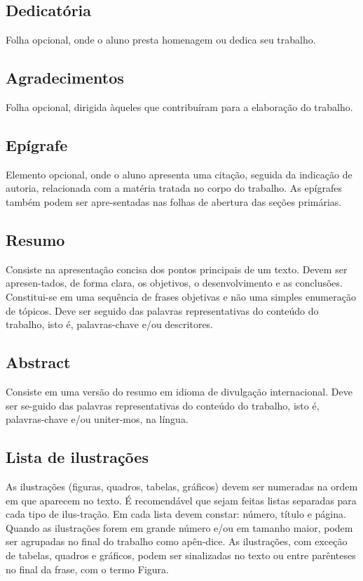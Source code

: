\subsection{Dedicatória}

Folha opcional, onde o aluno presta homenagem ou dedica seu trabalho.

\subsection{Agradecimentos}

Folha opcional, dirigida àqueles que contribuíram para a
elaboração do trabalho.

\subsection{Epígrafe}

Elemento opcional, onde o aluno apresenta uma citação, seguida da
indicação de autoria, relacionada com a matéria tratada no corpo do trabalho. As epígrafes também podem ser apre-sentadas nas folhas de abertura das seções primárias.

\subsection{Resumo}

Consiste na apresentação concisa dos pontos principais de um
texto. Devem ser apresen-tados, de forma clara, os objetivos, o desenvolvimento e as conclusões. Constitui-se em uma sequência de frases objetivas e não uma simples enumeração de tópicos. Deve ser seguido das palavras representativas do conteúdo do trabalho, isto é, palavras-chave e/ou descritores.

\subsection{Abstract}

Consiste em uma versão do resumo em idioma de divulgação
internacional. Deve ser se-guido das palavras representativas do conteúdo do trabalho, isto é, palavras-chave e/ou uniter-mos, na língua.

\subsection{Lista de ilustrações}

As ilustrações (figuras, quadros, tabelas, gráficos) devem ser
numeradas na ordem em que aparecem no texto. É recomendável que sejam feitas listas separadas para cada tipo de ilus-tração. Em cada lista devem constar: número, título e página. Quando as ilustrações forem em grande número e/ou em tamanho maior, podem ser agrupadas no final do trabalho como apên-dice. As ilustrações, com exceção de tabelas, quadros e gráficos, podem ser sinalizadas no texto ou entre parênteses no final da frase, com o termo Figura.

